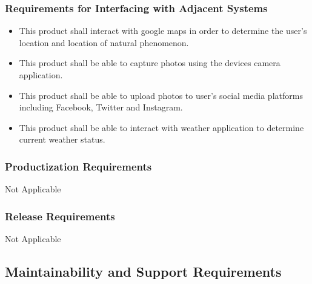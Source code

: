 \documentclass[]{article}
\begin{document}

\subsubsection{Requirements for Interfacing with Adjacent Systems}
\label{ssub:requirements_for_interfacing_with_adjacent_systems}
\begin{itemize}
	\item This product shall interact with google maps in order to determine the user's location and location of natural phenomenon.
	\item This product shall be able to capture photos using the devices camera application.
	\item This product shall be able to upload photos to user's social media platforms including Facebook, Twitter and Instagram.
	\item This product shall be able to interact with weather application to determine current weather status.
\end{itemize}

\subsubsection{Productization Requirements}
\label{ssub:productization_requirements}
	
	Not Applicable

\subsubsection{Release Requirements}
\label{ssub:release_requirements}
	Not Applicable



\subsection{Maintainability and Support Requirements}
\label{sub:maintainability_and_support_requirements}
\end{document}
